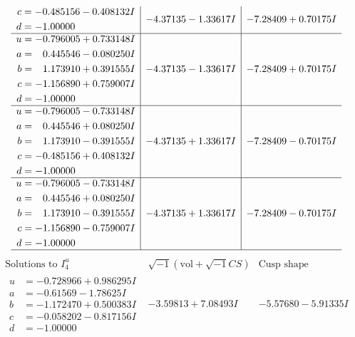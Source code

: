 \documentclass[1p]{elsarticle_modified}
\theoremstyle{definition}
\newcommand{\I}{\sqrt{-1}}
\begin{document}
$$\begin{array}{c|c|c}
\begin{aligned}
c &= -0.485156 - 0.408132 I \\
d &= -1.00000\phantom{ +0.000000I}\end{aligned}
 & -4.37135 - 1.33617 I & -7.28409 + 0.70175 I \\ \hline\begin{aligned}
u &= -0.796005 + 0.733148 I \\
a &= \phantom{-}0.445546 - 0.080250 I \\
b &= \phantom{-}1.173910 + 0.391555 I \\
c &= -1.156890 + 0.759007 I \\
d &= -1.00000\phantom{ +0.000000I}\end{aligned}
 & -4.37135 - 1.33617 I & -7.28409 + 0.70175 I \\ \hline\begin{aligned}
u &= -0.796005 - 0.733148 I \\
a &= \phantom{-}0.445546 + 0.080250 I \\
b &= \phantom{-}1.173910 - 0.391555 I \\
c &= -0.485156 + 0.408132 I \\
d &= -1.00000\phantom{ +0.000000I}\end{aligned}
 & -4.37135 + 1.33617 I & -7.28409 - 0.70175 I \\ \hline\begin{aligned}
u &= -0.796005 - 0.733148 I \\
a &= \phantom{-}0.445546 + 0.080250 I \\
b &= \phantom{-}1.173910 - 0.391555 I \\
c &= -1.156890 - 0.759007 I \\
d &= -1.00000\phantom{ +0.000000I}\end{aligned}
 & -4.37135 + 1.33617 I & -7.28409 - 0.70175 I\\
 \hline 
 \end{array}$$\newpage$$\begin{array}{c|c|c}  
\text{Solutions to }I^u_{4}& \I (\text{vol} + \sqrt{-1}CS) & \text{Cusp shape}\\
 \hline 
\begin{aligned}
u &= -0.728966 + 0.986295 I \\
a &= -0.61569 - 1.78625 I \\
b &= -1.172470 + 0.500383 I \\
c &= -0.058202 - 0.817156 I \\
d &= -1.00000\phantom{ +0.000000I}\end{aligned}
 & -3.59813 + 7.08493 I & -5.57680 - 5.91335 I \\ \hline\begin{aligned}

\end{aligned}
\end{array}$$
\end{document}
